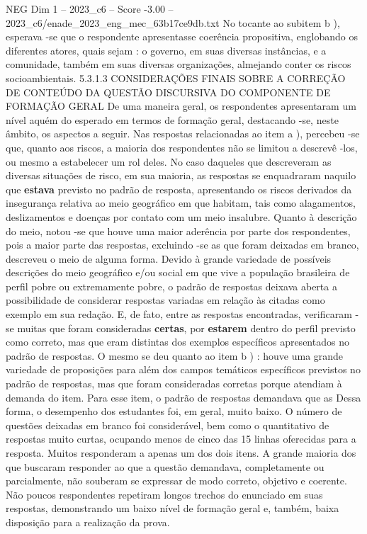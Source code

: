 \begin{textsample}{NEG Dim 1 – 2023\_c6 – Score -3.00 – 2023\_c6/enade\_2023\_eng\_mec\_63b17ce9db.txt}
No tocante ao subitem b ), esperava -se que o respondente apresentasse coerência propositiva, englobando os diferentes atores, quais sejam : o governo, em suas diversas instâncias, e a comunidade, também em suas diversas organizações, almejando conter os riscos socioambientais. 5.3.1.3 CONSIDERAÇÕES FINAIS SOBRE A CORREÇÃO DE CONTEÚDO DA QUESTÃO DISCURSIVA DO COMPONENTE DE FORMAÇÃO GERAL De uma maneira geral, os respondentes apresentaram um nível aquém do esperado em termos de formação geral, destacando -se, neste âmbito, os aspectos a seguir.
Nas respostas relacionadas ao item a ), percebeu -se que, quanto aos riscos, a maioria dos respondentes não se limitou a descrevê -los, ou mesmo a estabelecer um rol deles.
No caso daqueles que descreveram as diversas situações de risco, em sua maioria, as respostas se enquadraram naquilo que \textbf{estava} previsto no padrão de resposta, apresentando os riscos derivados da insegurança relativa ao meio geográfico em que habitam, tais como alagamentos, deslizamentos e doenças por contato com um meio insalubre.
Quanto à descrição do meio, notou -se que houve uma maior aderência por parte dos respondentes, pois a maior parte das respostas, excluindo -se as que foram deixadas em branco, descreveu o meio de alguma forma.
Devido à grande variedade de possíveis descrições do meio geográfico e/ou social em que vive a população brasileira de perfil pobre ou extremamente pobre, o padrão de respostas deixava aberta a possibilidade de considerar respostas variadas em relação às citadas como exemplo em sua redação.
E, de fato, entre as respostas encontradas, verificaram -se muitas que foram consideradas \textbf{certas}, por \textbf{estarem} dentro do perfil previsto como correto, mas que eram distintas dos exemplos específicos apresentados no padrão de respostas.
O mesmo se deu quanto ao item b ) : houve uma grande variedade de proposições para além dos campos temáticos específicos previstos no padrão de respostas, mas que foram consideradas corretas porque atendiam à demanda do item.
Para esse item, o padrão de respostas demandava que as Dessa forma, o desempenho dos estudantes foi, em geral, muito baixo.
O número de questões deixadas em branco foi considerável, bem como o quantitativo de respostas muito curtas, ocupando menos de cinco das 15 linhas oferecidas para a resposta.
Muitos responderam a apenas um dos dois itens.
A grande maioria dos que buscaram responder ao que a questão demandava, completamente ou parcialmente, não souberam se expressar de modo correto, objetivo e coerente.
Não poucos respondentes repetiram longos trechos do enunciado em suas respostas, demonstrando um baixo nível de formação geral e, também, baixa disposição para a realização da prova.

\end{textsample}

